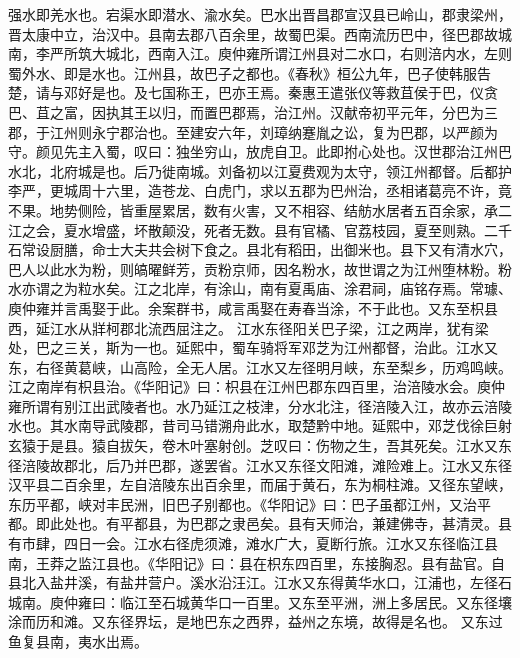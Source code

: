 \documentclass[12pt,UTF8]{ctexbook}
\begin{document}
强水即羌水也。宕渠水即潜水、渝水矣。巴水出晋昌郡宣汉县已岭山，郡隶梁州，晋太康中立，治汉中。县南去郡八百余里，故蜀巴渠。西南流历巴中，径巴郡故城南，李严所筑大城北，西南入江。庾仲雍所谓江州县对二水口，右则涪内水，左则蜀外水、即是水也。江州县，故巴子之都也。《春秋》桓公九年，巴子使韩服告楚，请与邓好是也。及七国称王，巴亦王焉。秦惠王遣张仪等救苴侯于巴，仪贪巴、苴之富，因执其王以归，而置巴郡焉，治江州。汉献帝初平元年，分巴为三郡，于江州则永宁郡治也。至建安六年，刘璋纳蹇胤之讼，复为巴郡，以严颜为守。颜见先主入蜀，叹曰：独坐穷山，放虎自卫。此即拊心处也。汉世郡治江州巴水北，北府城是也。后乃徙南城。刘备初以江夏费观为太守，领江州都督。后都护李严，更城周十六里，造苍龙、白虎门，求以五郡为巴州治，丞相诸葛亮不许，竟不果。地势侧险，皆重屋累居，数有火害，又不相容、结舫水居者五百余家，承二江之会，夏水增盛，坏散颠没，死者无数。县有官橘、官荔枝园，夏至则熟。二千石常设厨膳，命士大夫共会树下食之。县北有稻田，出御米也。县下又有清水穴，巴人以此水为粉，则皜曜鲜芳，贡粉京师，因名粉水，故世谓之为江州堕林粉。粉水亦谓之为粒水矣。江之北岸，有涂山，南有夏禹庙、涂君祠，庙铭存焉。常璩、庾仲雍并言禹娶于此。余案群书，咸言禹娶在寿春当涂，不于此也。又东至枳县西，延江水从牂柯郡北流西屈注之。
江水东径阳关巴子梁，江之两岸，犹有梁处，巴之三关，斯为一也。延熙中，蜀车骑将军邓芝为江州都督，治此。江水又东，右径黄葛峡，山高险，全无人居。江水又左径明月峡，东至梨乡，历鸡鸣峡。江之南岸有枳县治。《华阳记》曰：枳县在江州巴郡东四百里，治涪陵水会。庾仲雍所谓有别江出武陵者也。水乃延江之枝津，分水北注，径涪陵入江，故亦云涪陵水也。其水南导武陵郡，昔司马错溯舟此水，取楚黔中地。延熙中，邓芝伐徐巨射玄猿于是县。猿自拔矢，卷木叶塞射创。芝叹曰：伤物之生，吾其死矣。江水又东径涪陵故郡北，后乃并巴郡，遂罢省。江水又东径文阳滩，滩险难上。江水又东径汉平县二百余里，左自涪陵东出百余里，而届于黄石，东为桐柱滩。又径东望峡，东历平都，峡对丰民洲，旧巴子别都也。《华阳记》曰：巴子虽都江州，又治平都。即此处也。有平都县，为巴郡之隶邑矣。县有天师治，兼建佛寺，甚清灵。县有市肆，四日一会。江水右径虎须滩，滩水广大，夏断行旅。江水又东径临江县南，王莽之监江县也。《华阳记》曰：县在枳东四百里，东接胸忍。县有盐官。自县北入盐井溪，有盐井营户。溪水沿汪江。江水又东得黄华水口，江浦也，左径石城南。庾仲雍曰：临江至石城黄华口一百里。又东至平洲，洲上多居民。又东径壤涂而历和滩。又东径界坛，是地巴东之西界，益州之东境，故得是名也。
又东过鱼复县南，夷水出焉。
\end{document}
